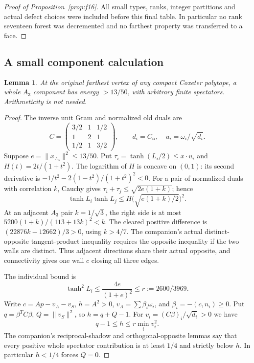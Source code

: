 \documentclass[11pt]{article}
\newtheorem{lemma}[theorem]{Lemma}
\begin{document}
\begin{proof}[Proof of Proposition~\ref{prop:f16}]
All small types, ranks, integer partitions and actual defect choices
were included before this final table. In particular no rank seventeen forest
was decremented and no farthest property was transferred to a face.
\end{proof}

\subsection{A small component calculation}

\begin{lemma}\label{lem:A3point26}
At the original farthest vertex of any compact Coxeter polytope,
a whole $A_3$ component has energy $>13/50$, with arbitrary finite
spectators. Arithmeticity is not needed.
\end{lemma}
\begin{proof}
The inverse unit Gram and normalized old duals are
\[
 C=\begin{pmatrix}3/2&1&1/2\\1&2&1\\1/2&1&3/2\end{pmatrix},
 \qquad d_i=C_{ii},\quad u_i=\omega_i/\sqrt{d_i}.
\]
Suppose $e=\|x_{A_3}\|^2\le13/50$. Put
$\tau_i=\tanh(L_i/2)\le x\cdot u_i$ and
$H(t)=2t/(1+t^2)$. The logarithm of $H$ is concave on $(0,1)$:
its second derivative is $-1/t^2-2(1-t^2)/(1+t^2)^2<0$.
For a pair of normalized duals with correlation $k$, Cauchy gives
$\tau_i+\tau_j\le\sqrt{2e(1+k)}$; hence
\[
 \tanh L_i\tanh L_j
 \le H\bigl(\sqrt{e(1+k)/2}\bigr)^2.
\]
At an adjacent $A_3$ pair $k=1/\sqrt3$, the right side is at most
$5200(1+k)/(113+13k)^2<k$.
The cleared positive difference is $(22876k-12662)/3>0$,
using $k>4/7$. The companion's actual distinct-opposite
tangent-product inequality requires the opposite inequality if the
two walls are distinct. Thus adjacent directions share their actual
opposite, and connectivity gives one wall $c$ closing all three edges.

The individual bound is
\[
 \tanh^2L_i\le\frac{4e}{(1+e)^2}\le r:=2600/3969.
\]
Write $c=A p-v_A-v_S$, $h=A^2>0$,
$v_A=\sum\beta_i\omega_i$, and $\beta_i=-(c,n_i)\ge0$.
Put $q=\beta^TC\beta$, $Q=\|v_S\|^2$, so $h=q+Q-1$.
For $v_i=(C\beta)_i/\sqrt{d_i}>0$ we have
\begin{equation}\label{eq:A3smallheight}
 q-1\le h\le r\min_i v_i^2.
\end{equation}
The companion's reciprocal-shadow and orthogonal-opposite lemmas
say that every positive whole spectator contribution is at least
$1/4$ and strictly below $h$. In particular $h<1/4$ forces $Q=0$.


\end{proof}
\end{document}
